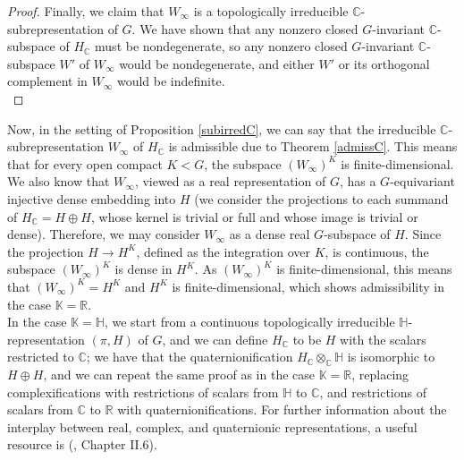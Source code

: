 \documentclass{article}
\theoremstyle{definition}
\theoremstyle{remark}
\theoremstyle{plain}
\begin{document}
\begin{proof}
    Finally, we claim that $W_{\infty}$ is a topologically irreducible $\mathbb{C}$-subrepresentation of $G$. We have shown that any nonzero closed $G$-invariant $\mathbb{C}$-subspace of $H_\mathbb{C}$ must be nondegenerate, so any nonzero closed $G$-invariant $\mathbb{C}$-subspace $W'$ of $W_{\infty}$ would be nondegenerate, and either $W'$ or its orthogonal complement in $W_{\infty}$ would be indefinite. \\
\end{proof}

Now, in the setting of Proposition \ref{subirredC}, we can say that the irreducible $\mathbb{C}$-subrepresentation $W_{\infty}$ of $H_\mathbb{C}$ is admissible due to Theorem \ref{admissC}. This means that for every open compact $K<G$, the subspace $(W_{\infty})^K$ is finite-dimensional. We also know that $W_{\infty}$, viewed as a real representation of $G$, has a $G$-equivariant injective dense embedding into $H$ (we consider the projections to each summand of $H_\mathbb{C}=H\oplus H$, whose kernel is trivial or full and whose image is trivial or dense). Therefore, we may consider $W_{\infty}$ as a dense real $G$-subspace of $H$. Since the projection $H\rightarrow H^K$, defined as the integration over $K$, is continuous, the subspace $(W_{\infty})^K$ is dense in $H^K$. As $(W_{\infty})^K$ is finite-dimensional, this means that $(W_{\infty})^K=H^K$ and $H^K$ is finite-dimensional, which shows admissibility in the case $\mathbb{K}=\mathbb{R}$. \\

In the case $\mathbb{K}=\mathbb{H}$, we start from a continuous topologically irreducible $\mathbb{H}$-representation $(\pi,H)$ of $G$, and we can define $H_\mathbb{C}$ to be $H$ with the scalars restricted to $\mathbb{C}$; we have that the quaternionification $H_\mathbb{C}\otimes_\mathbb{C}\mathbb{H}$ is isomorphic to $H\oplus H$, and we can repeat the same proof as in the case $\mathbb{K}=\mathbb{R}$, replacing complexifications with restrictions of scalars from $\mathbb{H}$ to $\mathbb{C}$, and restrictions of scalars from $\mathbb{C}$ to $\mathbb{R}$ with quaternionifications. For further information about the interplay between real, complex, and quaternionic representations, a useful resource is (\cite{brodieck}, Chapter II.6).

\printbibliography[heading=bibintoc]
\end{document}
